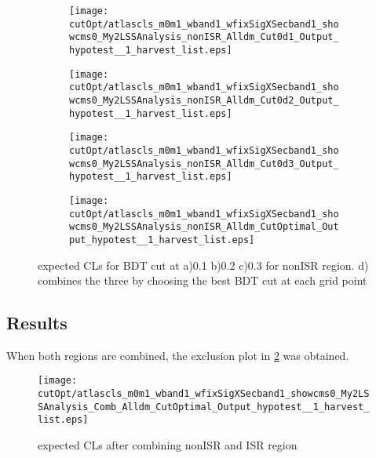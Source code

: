 \begin{figure}
	\centering
    \begin{subfigure}[b]{0.4\textwidth}
        \texttt{[image: cutOpt/atlascls\_m0m1\_wband1\_wfixSigXSecband1\_showcms0\_My2LSSAnalysis\_nonISR\_Alldm\_Cut0d1\_Output\_hypotest\_\_1\_harvest\_list.eps]}
        \caption{}
    \end{subfigure}
    \begin{subfigure}[b]{0.4\textwidth}
        \texttt{[image: cutOpt/atlascls\_m0m1\_wband1\_wfixSigXSecband1\_showcms0\_My2LSSAnalysis\_nonISR\_Alldm\_Cut0d2\_Output\_hypotest\_\_1\_harvest\_list.eps]}
        \caption{}
    \end{subfigure}

    \begin{subfigure}[b]{0.4\textwidth}
        \texttt{[image: cutOpt/atlascls\_m0m1\_wband1\_wfixSigXSecband1\_showcms0\_My2LSSAnalysis\_nonISR\_Alldm\_Cut0d3\_Output\_hypotest\_\_1\_harvest\_list.eps]}
        \caption{}
    \end{subfigure}
    \begin{subfigure}[b]{0.4\textwidth}
        \texttt{[image: cutOpt/atlascls\_m0m1\_wband1\_wfixSigXSecband1\_showcms0\_My2LSSAnalysis\_nonISR\_Alldm\_CutOptimal\_Output\_hypotest\_\_1\_harvest\_list.eps]}
        \caption{}
    \end{subfigure}

\caption{expected CLs for BDT cut at a)0.1 b)0.2 c)0.3 for nonISR region. d) combines the three by choosing the best BDT cut at each grid point }
\label{fig:nonISR_BDTCut_CLs}
\end{figure}

\subsection{Results}
When both regions are combined, the exclusion plot in \ref{fig:comb_CLs} was obtained.

\begin{figure}
\centering
\texttt{[image: cutOpt/atlascls\_m0m1\_wband1\_wfixSigXSecband1\_showcms0\_My2LSSAnalysis\_Comb\_Alldm\_CutOptimal\_Output\_hypotest\_\_1\_harvest\_list.eps]}
\caption{expected CLs after combining nonISR and ISR region}
\label{fig:comb_CLs}
\end{figure}

